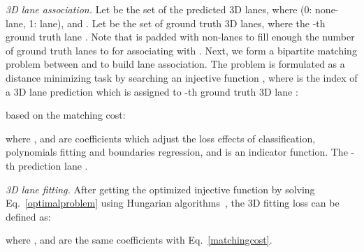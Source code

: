 \documentclass[letterpaper]{article} \usepackage{aaai22}  \usepackage{times}  \usepackage{helvet}  \usepackage{courier}  \usepackage[hyphens]{url}  \usepackage{graphicx} \urlstyle{rm} \def\UrlFont{\rm}  \usepackage{natbib}  \usepackage{caption}
\begin{document}
\emph{3D lane association.} Let   be
the set of the predicted 3D lanes, where  (0: none-lane, 1: lane), and  . Let  be the set of ground truth 3D lanes, where the -th ground truth lane . Note that  is padded with non-lanes to fill enough the number of ground truth lanes to  for associating with . Next, we form a bipartite matching problem between  and  to build lane association.
The problem is formulated as a distance minimizing task by searching an injective function , where  is the index of a 3D lane prediction  which is assigned to -th ground truth 3D lane :



based on the matching cost:

where ,  and  are coefficients which adjust the loss effects of classification, polynomials fitting and boundaries regression, and  is an indicator function. The -th prediction lane .

\emph{3D lane fitting.} After getting the optimized injective function  by solving Eq.~\ref{optimalproblem} using Hungarian algorithms~\cite{DETR}, the 3D fitting loss can be defined as:

where ,  and  are the same coefficients with Eq.~\ref{matchingcost}.
\end{document}
